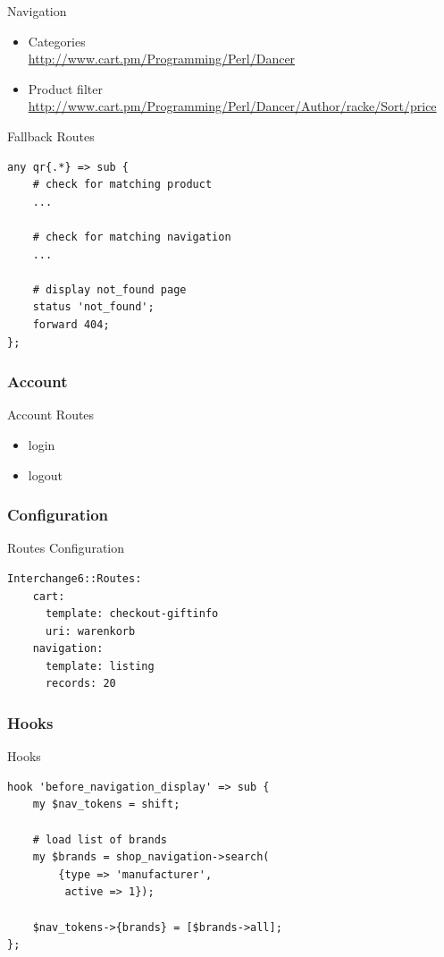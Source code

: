 \begin{frame}{Navigation}
\begin{itemize}
\item Categories \\
\url{http://www.cart.pm/Programming/Perl/Dancer}
\item Product filter \\
\url{http://www.cart.pm/Programming/Perl/Dancer/Author/racke/Sort/price}
\end{itemize}
\end{frame}

\begin{frame}[fragile]{Fallback Routes}
\begin{lstlisting}
any qr{.*} => sub {
    # check for matching product
    ...

    # check for matching navigation
    ...

    # display not_found page
    status 'not_found';
    forward 404;
};
\end{lstlisting}
\end{frame}

\subsubsection{Account}
\begin{frame}[fragile]{Account Routes}
\begin{itemize}
\item login
\item logout
\end{itemize}
\end{frame}

\subsubsection{Configuration}
\begin{frame}[fragile]{Routes Configuration}
\begin{lstlisting}
Interchange6::Routes:
    cart:
      template: checkout-giftinfo
      uri: warenkorb
    navigation:
      template: listing
      records: 20
\end{lstlisting}
\end{frame}

\subsubsection{Hooks}
\begin{frame}[fragile]{Hooks}
\begin{lstlisting}
hook 'before_navigation_display' => sub {
    my $nav_tokens = shift;

    # load list of brands
    my $brands = shop_navigation->search(
        {type => 'manufacturer',
         active => 1});

    $nav_tokens->{brands} = [$brands->all];
};
\end{lstlisting}
\end{frame}

